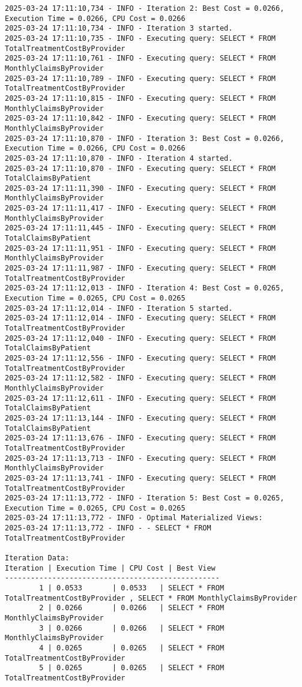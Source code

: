 \begin{lstlisting}[style=pythonstyle, caption={Output from python code }, label={lst:pso_fullOutput}]
2025-03-24 17:11:10,734 - INFO - Iteration 2: Best Cost = 0.0266, Execution Time = 0.0266, CPU Cost = 0.0266
2025-03-24 17:11:10,734 - INFO - Iteration 3 started.
2025-03-24 17:11:10,735 - INFO - Executing query: SELECT * FROM TotalTreatmentCostByProvider 
2025-03-24 17:11:10,761 - INFO - Executing query: SELECT * FROM MonthlyClaimsByProvider 
2025-03-24 17:11:10,789 - INFO - Executing query: SELECT * FROM TotalTreatmentCostByProvider 
2025-03-24 17:11:10,815 - INFO - Executing query: SELECT * FROM MonthlyClaimsByProvider 
2025-03-24 17:11:10,842 - INFO - Executing query: SELECT * FROM MonthlyClaimsByProvider 
2025-03-24 17:11:10,870 - INFO - Iteration 3: Best Cost = 0.0266, Execution Time = 0.0266, CPU Cost = 0.0266
2025-03-24 17:11:10,870 - INFO - Iteration 4 started.
2025-03-24 17:11:10,870 - INFO - Executing query: SELECT * FROM TotalClaimsByPatient 
2025-03-24 17:11:11,390 - INFO - Executing query: SELECT * FROM MonthlyClaimsByProvider 
2025-03-24 17:11:11,417 - INFO - Executing query: SELECT * FROM MonthlyClaimsByProvider 
2025-03-24 17:11:11,445 - INFO - Executing query: SELECT * FROM TotalClaimsByPatient 
2025-03-24 17:11:11,951 - INFO - Executing query: SELECT * FROM MonthlyClaimsByProvider 
2025-03-24 17:11:11,987 - INFO - Executing query: SELECT * FROM TotalTreatmentCostByProvider 
2025-03-24 17:11:12,013 - INFO - Iteration 4: Best Cost = 0.0265, Execution Time = 0.0265, CPU Cost = 0.0265
2025-03-24 17:11:12,014 - INFO - Iteration 5 started.
2025-03-24 17:11:12,014 - INFO - Executing query: SELECT * FROM TotalTreatmentCostByProvider 
2025-03-24 17:11:12,040 - INFO - Executing query: SELECT * FROM TotalClaimsByPatient 
2025-03-24 17:11:12,556 - INFO - Executing query: SELECT * FROM TotalTreatmentCostByProvider 
2025-03-24 17:11:12,582 - INFO - Executing query: SELECT * FROM MonthlyClaimsByProvider 
2025-03-24 17:11:12,611 - INFO - Executing query: SELECT * FROM TotalClaimsByPatient 
2025-03-24 17:11:13,144 - INFO - Executing query: SELECT * FROM TotalClaimsByPatient 
2025-03-24 17:11:13,676 - INFO - Executing query: SELECT * FROM TotalTreatmentCostByProvider 
2025-03-24 17:11:13,713 - INFO - Executing query: SELECT * FROM MonthlyClaimsByProvider 
2025-03-24 17:11:13,741 - INFO - Executing query: SELECT * FROM TotalTreatmentCostByProvider 
2025-03-24 17:11:13,772 - INFO - Iteration 5: Best Cost = 0.0265, Execution Time = 0.0265, CPU Cost = 0.0265
2025-03-24 17:11:13,772 - INFO - Optimal Materialized Views:
2025-03-24 17:11:13,772 - INFO - - SELECT * FROM TotalTreatmentCostByProvider 

Iteration Data:
Iteration | Execution Time | CPU Cost | Best View
--------------------------------------------------
        1 | 0.0533       | 0.0533   | SELECT * FROM TotalTreatmentCostByProvider , SELECT * FROM MonthlyClaimsByProvider 
        2 | 0.0266       | 0.0266   | SELECT * FROM MonthlyClaimsByProvider 
        3 | 0.0266       | 0.0266   | SELECT * FROM MonthlyClaimsByProvider 
        4 | 0.0265       | 0.0265   | SELECT * FROM TotalTreatmentCostByProvider 
        5 | 0.0265       | 0.0265   | SELECT * FROM TotalTreatmentCostByProvider 


\end{lstlisting}
